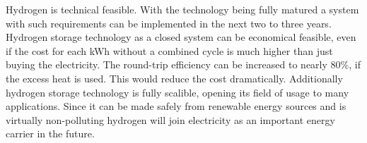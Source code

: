 \begin{parcolumns}[colwidths={1=2.5 cm, 2=10 cm, 3=2.5cm}]{3}
{Hydrogen is technical feasible. With the technology being fully matured a system with such requirements can be implemented in the next two to three years. \\


Hydrogen storage technology as a closed system can be economical feasible, even if the cost for each kWh without a combined cycle is much higher than just buying the electricity. The round-trip efficiency can be increased to nearly 80\%, if the excess heat is used. This would reduce the cost dramatically. Additionally hydrogen storage technology is fully scalible, opening its field of usage to many applications. Since it can be made safely from renewable energy sources and is virtually non-polluting hydrogen will join electricity as an important energy carrier in the future.
}


\end{parcolumns}